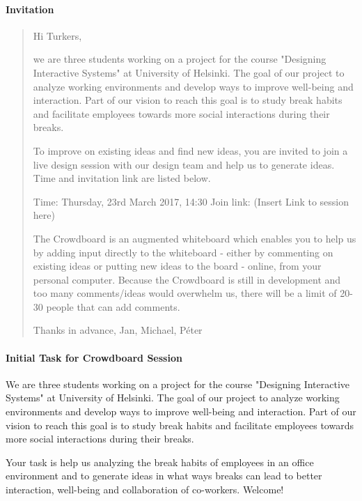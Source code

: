 \documentclass[english]{tktltiki}
\begin{document}
\paragraph{Invitation}
\begin{quote}
Hi Turkers,

we are three students working on a project for the course "Designing Interactive Systems" at University of Helsinki. The goal of our project to analyze working environments and develop ways to improve well-being and interaction. Part of our vision to reach this goal is to study break habits and facilitate employees towards more social interactions during their breaks. 

To improve on existing ideas and find new ideas, you are invited to join a live design session with our design team and help us to generate ideas. Time and invitation link are listed below.

Time: Thursday, 23rd March 2017, 14:30
Join link: (Insert Link to session here)

The Crowdboard is an augmented whiteboard which enables you to help us by adding input directly to the whiteboard - either by commenting on existing ideas or putting new ideas to the board - online, from your personal computer. Because the Crowdboard is still in development and too many comments/ideas would overwhelm us, there will be a limit of 20-30 people that can add comments. 

Thanks in advance,
Jan, Michael, Péter
\end{quote}


\paragraph{Initial Task for Crowdboard Session}
We are three students working on a project for the course "Designing Interactive Systems" at University of Helsinki. The goal of our project to analyze working environments and develop ways to improve well-being and interaction. Part of our vision to reach this goal is to study break habits and facilitate employees towards more social interactions during their breaks. 

Your task is help us analyzing the break habits of employees in an office environment and to generate ideas in what ways breaks can lead to better interaction, well-being and collaboration of co-workers. Welcome! 
\end{document}
